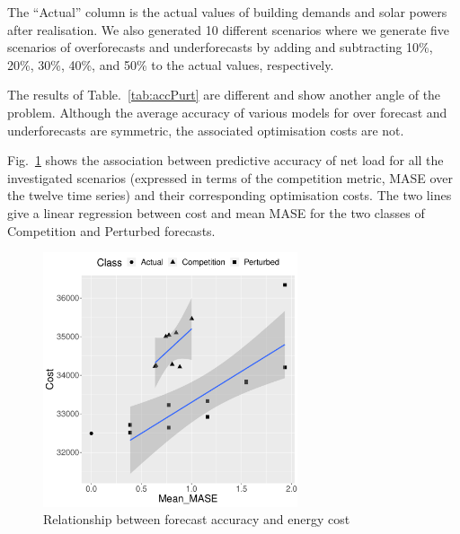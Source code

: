\documentclass[conference]{IEEEtran}
\begin{document}
The ``Actual'' column is the actual values of building demands and solar powers after realisation. We also generated 10 different scenarios where we generate five scenarios of overforecasts and underforecasts by adding and subtracting  10\%, 20\%, 30\%, 40\%, and 50\% to the actual values, respectively.

The results of Table.~\ref{tab:accPurt} are different and show another angle of the problem. Although the average accuracy of various models for over forecast and underforecasts are symmetric, the associated optimisation costs are not. %

%
%

Fig.~\ref{fig:acc} shows the association between predictive accuracy of net load for all the investigated scenarios (expressed in terms of the competition metric, MASE over the twelve time series) and their corresponding optimisation costs. The two lines give a linear regression between cost and mean MASE for the two classes of Competition and Perturbed forecasts.  %
\begin{figure}[htbp]
\centerline{\includegraphics[width=7.5cm]{Figures/Mean_MASE_vs_Cost_10nov22.pdf}}


\caption{Relationship between forecast accuracy and energy cost}
\label{fig:acc}
\end{figure}
\end{document}
